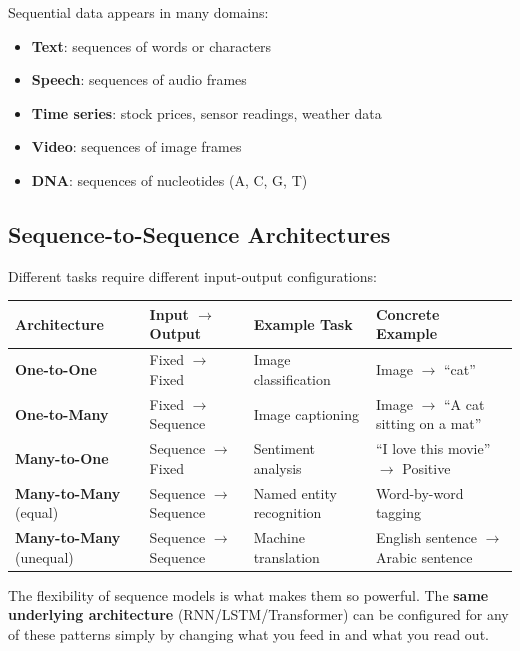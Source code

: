 \documentclass[11pt,a4paper]{article}
\begin{document}
Sequential data appears in many domains:
\begin{itemize}[leftmargin=1.5em]
    \item \textbf{Text}: sequences of words or characters
    \item \textbf{Speech}: sequences of audio frames
    \item \textbf{Time series}: stock prices, sensor readings, weather data
    \item \textbf{Video}: sequences of image frames
    \item \textbf{DNA}: sequences of nucleotides (A, C, G, T)
\end{itemize}

\subsection{Sequence-to-Sequence Architectures}

Different tasks require different input-output configurations:

\begin{center}
\renewcommand{\arraystretch}{1.4}
\begin{tabular}{@{}p{3.5cm}p{3.5cm}p{3cm}p{3cm}@{}}
\toprule
\textbf{Architecture} & \textbf{Input $\to$ Output} & \textbf{Example Task} & \textbf{Concrete Example} \\
\midrule
\textbf{One-to-One} & Fixed $\to$ Fixed & Image classification & Image $\to$ ``cat'' \\
\textbf{One-to-Many} & Fixed $\to$ Sequence & Image captioning & Image $\to$ ``A cat sitting on a mat'' \\
\textbf{Many-to-One} & Sequence $\to$ Fixed & Sentiment analysis & ``I love this movie'' $\to$ Positive \\
\textbf{Many-to-Many} (equal) & Sequence $\to$ Sequence & Named entity recognition & Word-by-word tagging \\
\textbf{Many-to-Many} (unequal) & Sequence $\to$ Sequence & Machine translation & English sentence $\to$ Arabic sentence \\
\bottomrule
\end{tabular}
\end{center}

\begin{tcolorbox}[intuitionbox={Intuition}]
The flexibility of sequence models is what makes them so powerful. The \textbf{same underlying architecture} (RNN/LSTM/Transformer) can be configured for any of these patterns simply by changing what you feed in and what you read out.
\end{tcolorbox}
\end{document}

